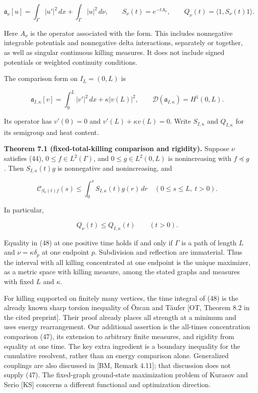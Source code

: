 \documentclass[11pt]{article}
\begin{document}
\[
\mathfrak a_\nu[u]=\int_\Gamma |u'|^2\,dx+\int_\Gamma |u|^2\,d\nu,
\qquad S_\nu(t)=e^{-tA_\nu},
\qquad Q_\nu(t)=\langle 1,S_\nu(t)1\rangle.
\tag{45}
\]

Here \(A_\nu\) is the operator associated with the form. This includes
nonnegative integrable potentials and nonnegative delta interactions,
separately or together, as well as singular continuous killing measures.
It does not include signed potentials or weighted continuity conditions.

The comparison form on \(I_L=(0,L)\) is

\[
\mathfrak a_{I,\kappa}[v]=\int_0^L|v'|^2\,dx+\kappa|v(L)|^2,
\qquad \mathcal D(\mathfrak a_{I,\kappa})=H^1(0,L).
\tag{46}
\]

Its operator has \(v'(0)=0\) and \(v'(L)+\kappa v(L)=0\). Write
\(S_{I,\kappa}\) and \(Q_{I,\kappa}\) for its semigroup and heat
content.

\textbf{Theorem 7.1 (fixed-total-killing comparison and rigidity).}
Suppose \(\nu\) satisfies (44), \(0\le f\in L^2(\Gamma)\), and
\(0\le g\in L^2(0,L)\) is nonincreasing with \(f\preccurlyeq g\). Then
\(S_{I,\kappa}(t)g\) is nonnegative and nonincreasing, and

\[
\mathcal C_{S_\nu(t)f}(s)
\le \int_0^s S_{I,\kappa}(t)g(r)\,dr
\quad(0\le s\le L,\ t>0).
\tag{47}
\]

In particular,

\[
Q_\nu(t)\le Q_{I,\kappa}(t)\qquad(t>0).
\tag{48}
\]

Equality in (48) at one positive time holds if and only if \(\Gamma\) is
a path of length \(L\) and \(\nu=\kappa\delta_p\) at one endpoint \(p\).
Subdivision and reflection are immaterial. Thus the interval with all
killing concentrated at one endpoint is the unique maximizer, as a
metric space with killing measure, among the stated graphs and measures
with fixed \(L\) and \(\kappa\).

For killing supported on finitely many vertices, the time integral of
(48) is the already known sharp torsion inequality of Özcan and Täufer
{[}OT, Theorem 8.2 in the cited preprint{]}. Their proof already places
all strength at a minimum and uses energy rearrangement. Our additional
assertion is the all-times concentration comparison (47), its extension
to arbitrary finite measures, and rigidity from equality at one time.
The key extra ingredient is a boundary inequality for the cumulative
resolvent, rather than an energy comparison alone. Generalized couplings
are also discussed in {[}BM, Remark 4.11{]}; that discussion does not
supply (47). The fixed-graph ground-state maximization problem of
Kurasov and Serio {[}KS{]} concerns a different functional and
optimization direction.
\end{document}

